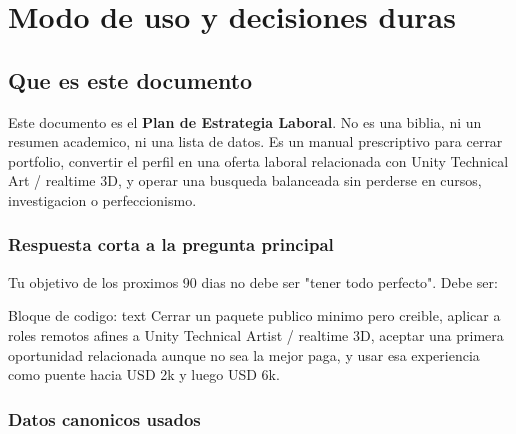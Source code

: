 \chapter{Modo de uso y decisiones duras}

\section{Que es este documento}


Este documento es el \textbf{Plan de Estrategia Laboral}. No es una biblia, ni un resumen academico, ni una lista de datos. Es un manual prescriptivo para cerrar portfolio, convertir el perfil en una oferta laboral relacionada con Unity Technical Art / realtime 3D, y operar una busqueda balanceada sin perderse en cursos, investigacion o perfeccionismo.


\subsection{Respuesta corta a la pregunta principal}


Tu objetivo de los proximos 90 dias no debe ser "tener todo perfecto". Debe ser:


\begin{mdcode}
Bloque de codigo: text
Cerrar un paquete publico minimo pero creible, aplicar a roles remotos afines a Unity Technical Artist / realtime 3D, aceptar una primera oportunidad relacionada aunque no sea la mejor paga, y usar esa experiencia como puente hacia USD 2k y luego USD 6k.
\end{mdcode}


\subsection{Datos canonicos usados}


